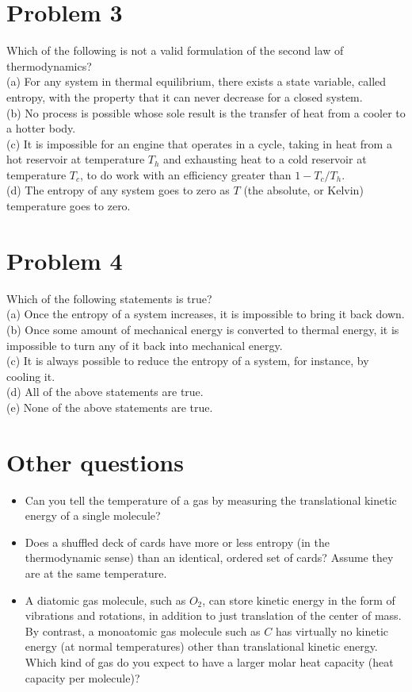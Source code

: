 \documentclass[10pt]{article}
\begin{document}
\section*{Problem 3}
Which of the following is not a valid formulation of the second law of thermodynamics?\\
(a) For any system in thermal equilibrium, there exists a state variable, called entropy, with the property that it can never decrease for a closed system.\\
(b) No process is possible whose sole result is the transfer of heat from a cooler to a hotter body.\\
(c) It is impossible for an engine that operates in a cycle, taking in heat from a hot reservoir at temperature $T_{h}$ and exhausting heat to a cold reservoir at temperature $T_{c}$, to do work with an efficiency greater than $1-T_{c} / T_{h}$.\\
(d) The entropy of any system goes to zero as $T$ (the absolute, or Kelvin) temperature goes to zero.

\section*{Problem 4}
Which of the following statements is true?\\
(a) Once the entropy of a system increases, it is impossible to bring it back down.\\
(b) Once some amount of mechanical energy is converted to thermal energy, it is impossible to turn any of it back into mechanical energy.\\
(c) It is always possible to reduce the entropy of a system, for instance, by cooling it.\\
(d) All of the above statements are true.\\
(e) None of the above statements are true.

\section*{Other questions}
\begin{itemize}
  \item Can you tell the temperature of a gas by measuring the translational kinetic energy of a single molecule?
  \item Does a shuffled deck of cards have more or less entropy (in the thermodynamic sense) than an identical, ordered set of cards? Assume they are at the same temperature.
  \item A diatomic gas molecule, such as $O_{2}$, can store kinetic energy in the form of vibrations and rotations, in addition to just translation of the center of mass. By contrast, a monoatomic gas molecule such as $C$ has virtually no kinetic energy (at normal temperatures) other than translational kinetic energy. Which kind of gas do you expect to have a larger molar heat capacity (heat capacity per molecule)?
\end{itemize}
\end{document}
